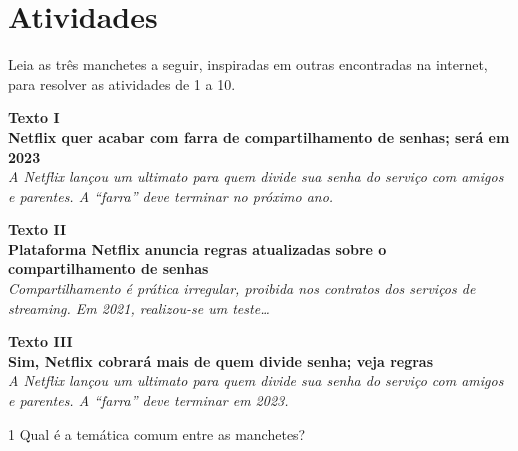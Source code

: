 \section*{Atividades}

Leia as três manchetes a seguir, inspiradas em outras encontradas na
internet, para resolver as atividades de 1 a 10.

\begin{myquote}
\begin{center}
\textbf{Texto I}\\

\noindent\textbf{Netflix quer acabar com farra de compartilhamento de senhas;
será em 2023}\\
\emph{A Netflix lançou um ultimato para quem divide sua
senha do serviço com amigos e parentes. A ``farra'' deve terminar no
próximo ano.} 
\end{center}

\end{myquote}

\begin{myquote}
\begin{center}
\textbf{Texto II}\\

\noindent\textbf{Plataforma Netflix anuncia regras atualizadas sobre o
compartilhamento de senhas}\\
\emph{Compartilhamento é prática irregular,
proibida nos contratos dos serviços de streaming. Em 2021, realizou-se
um teste\ldots{}} 
\end{center}

\end{myquote}

\begin{myquote}
\begin{center}
\textbf{Texto III}\\

\noindent\textbf{Sim, Netflix cobrará mais de quem divide senha; veja regras}\\
\emph{A Netflix lançou um ultimato para quem divide sua senha do serviço
com amigos e parentes. A ``farra'' deve terminar em 2023.} 
\end{center}

\end{myquote}

\num{1} Qual é a temática comum entre as manchetes?


